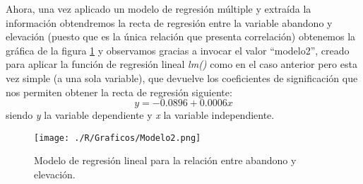 \documentclass[11pt,a4paper]{article}
\begin{document}
Ahora, una vez aplicado un modelo de regresión múltiple y extraída la información obtendremos la recta de regresión entre la variable abandono y elevación (puesto que es la única relación que presenta correlación) obtenemos la gráfica de la figura \ref{fig:lm2} y observamos gracias a invocar el valor ``modelo2'', creado para aplicar la función de regresión lineal \textit{lm()} como en el caso anterior pero esta vez simple (a una sola variable), que devuelve los coeficientes de significación que nos permiten obtener la recta de regresión siguiente:
\begin{equation}
y=-0.0896+0.0006x
\label{eq:regre.elev}
\end{equation}
\noindent siendo \textit{y} la variable dependiente y \textit{x} la variable independiente.

\begin{figure}
	\centering
	\texttt{[image: ./R/Graficos/Modelo2.png]}
	\caption{Modelo de regresión lineal para la relación entre abandono y elevación.}
	\label{fig:lm2}
\end{figure}
\end{document}
